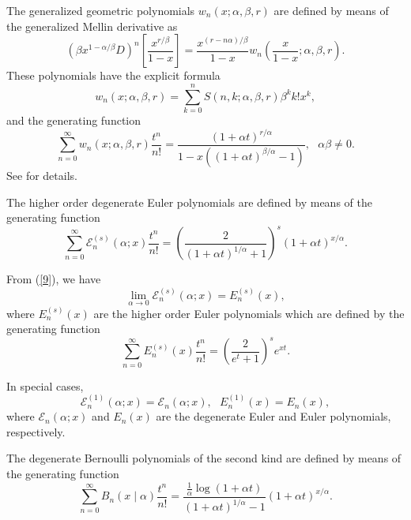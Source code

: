 \documentclass{article}%
\begin{document}
The generalized geometric polynomials $w_{n}\left(  x;\alpha,\beta,r\right)  $
are defined by means of the generalized Mellin derivative as%
\[
\left(  \beta x^{1-\alpha/\beta}D\right)  ^{n}\left[  \frac{x^{r/\beta}}%
{1-x}\right]  =\frac{x^{\left(  r-n\alpha\right)  /\beta}}{1-x}w_{n}\left(
\frac{x}{1-x};\alpha,\beta,r\right)  .
\]
These polynomials have the explicit formula
\begin{equation}
w_{n}\left(  x;\alpha,\beta,r\right)  =\sum_{k=0}^{n}S\left(  n,k;\alpha
,\beta,r\right)  \beta^{k}k!x^{k}, \label{11}%
\end{equation}
and the generating function
\begin{equation}
\sum_{n=0}^{\infty}w_{n}\left(  x;\alpha,\beta,r\right)  \frac{t^{n}}%
{n!}=\frac{\left(  1+\alpha t\right)  ^{r/\alpha}}{1-x\left(  \left(  1+\alpha
t\right)  ^{\beta/\alpha}-1\right)  },\text{ \ }\alpha\beta\neq0. \label{19}%
\end{equation}
See \cite{Kargin} for details.

The higher order degenerate Euler polynomials are defined by means of the
generating function \cite{Carlitz}%
\begin{equation}
\sum_{n=0}^{\infty}\mathcal{E}_{n}^{\left(  s\right)  }\left(  \alpha
;x\right)  \frac{t^{n}}{n!}=\left(  \frac{2}{\left(  1+\alpha t\right)
^{1/\alpha}+1}\right)  ^{s}\left(  1+\alpha t\right)  ^{x/\alpha}. \label{9}%
\end{equation}


From (\ref{9}), we have%
\[
\underset{\alpha\rightarrow0}{\lim}\mathcal{E}_{n}^{\left(  s\right)  }\left(
\alpha;x\right)  =E_{n}^{\left(  s\right)  }\left(  x\right)  ,
\]
where $E_{n}^{\left(  s\right)  }\left(  x\right)  $ are the higher order
Euler polynomials which are defined by the generating function%
\begin{equation}
\sum_{n=0}^{\infty}E_{n}^{\left(  s\right)  }\left(  x\right)  \frac{t^{n}%
}{n!}=\left(  \frac{2}{e^{t}+1}\right)  ^{s}e^{xt}. \label{28}%
\end{equation}


In special cases,%
\[
\mathcal{E}_{n}^{\left(  1\right)  }\left(  \alpha;x\right)  =\mathcal{E}%
_{n}\left(  \alpha;x\right)  ,\text{ }E_{n}^{\left(  1\right)  }\left(
x\right)  =E_{n}\left(  x\right)  ,
\]
where $\mathcal{E}_{n}\left(  \alpha;x\right)  $ and $E_{n}\left(  x\right)  $
are the degenerate Euler and Euler polynomials, respectively.

The degenerate Bernoulli polynomials of the second kind are defined by means
of the generating function \cite{Kim}%
\begin{equation}
\sum_{n=0}^{\infty}B_{n}\left(  x\mid\alpha\right)  \frac{t^{n}}{n!}%
=\frac{\frac{1}{\alpha}\log\left(  1+\alpha t\right)  }{\left(  1+\alpha
t\right)  ^{1/\alpha}-1}\left(  1+\alpha t\right)  ^{x/\alpha}. \label{34}%
\end{equation}
\end{document}
